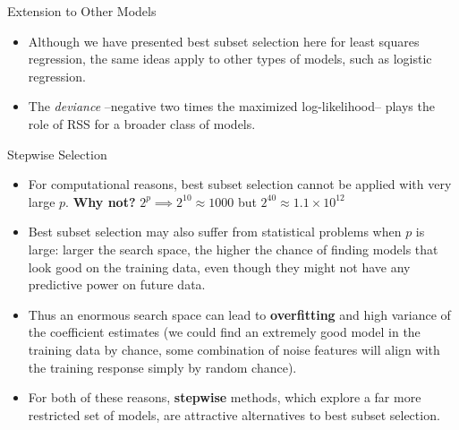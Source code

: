 \documentclass[aspectratio=169, 11pt]{beamer}
\begin{document}
\begin{frame}{Extension to Other Models}
    \begin{itemize}
        \item Although we have presented best subset selection here for least squares regression, the same ideas apply to other types of models, such as logistic regression.
        \item The \textit{deviance}\textbf{} --negative two times the maximized log-likelihood-- plays the role of RSS for a broader class of models.
    \end{itemize}
\end{frame}


\begin{frame}{Stepwise Selection}
    \begin{itemize}
        \item For computational reasons, best subset selection cannot be applied with very large $p$. \textbf{Why not?} \pause
        $2^p \implies 2^{10} \approx 1000$ but $2^{40} \approx 1.1 \times 10^{12}$

        \item Best subset selection may also suffer from statistical problems when $p$ is large: larger the search space, the higher the chance of finding models that look good on the training data, even though they might not have any predictive power on future data.\pause

        \item Thus an enormous search space can lead to \textbf{overfitting} and high variance of the coefficient estimates (we could find an extremely good model in the training data by chance, some combination of noise features will align with the training response simply by random chance).\pause

        \item For both of these reasons, \textbf{stepwise} methods, which explore a far more restricted set of models, are attractive alternatives to best subset selection.
    \end{itemize}
\end{frame}
\end{document}
